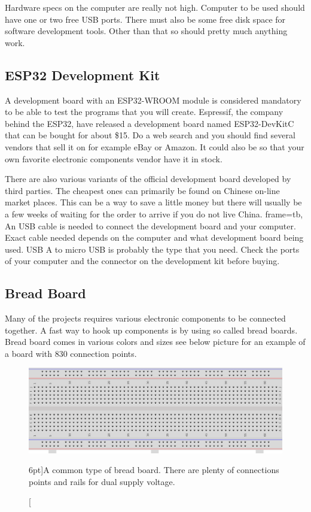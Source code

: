 \documentclass{tufte-book}
\begin{document}
Hardware specs on the computer are really not high. Computer to be used should have one or two free USB ports. There must also be some free disk space for software development tools. Other than that so should pretty much anything work.

\subsection{ESP32 Development Kit}
A development board with an ESP32-WROOM module is considered mandatory to be able to test the programs that you will create. Espressif, the company behind the ESP32, have released a development board named ESP32-DevKitC that can be bought for about \$15. Do a web search and you should find several vendors that sell it on for example eBay or Amazon. It could also be so that your own favorite electronic components vendor have it in stock.

There are also various variants of the official development board developed by third parties. The cheapest ones can primarily be found on Chinese on-line market places. This can be a way to save a little money but there will usually be a few weeks of waiting for the order to arrive if you do not live China.
frame=tb,
An USB cable is needed to connect the development board and your computer. Exact cable needed depends on the computer and what development board being used. USB A to micro USB is probably the type that you need. Check the ports of your computer and the connector on the development kit before buying.

\subsection{Bread Board}
Many of the projects requires various electronic components to be connected together. A fast way to hook up components is by using so called bread boards. Bread board comes in various colors and sizes see below picture for an example of a board with 830 connection points.

\begin{figure}
	\includegraphics{bread_board.png}
	\caption[Bread board $n$.][6pt]{A common type of bread board. There are plenty of connections points and rails for dual supply voltage.}
	\label{fig:bread_board}
\end{figure}
\end{document}
